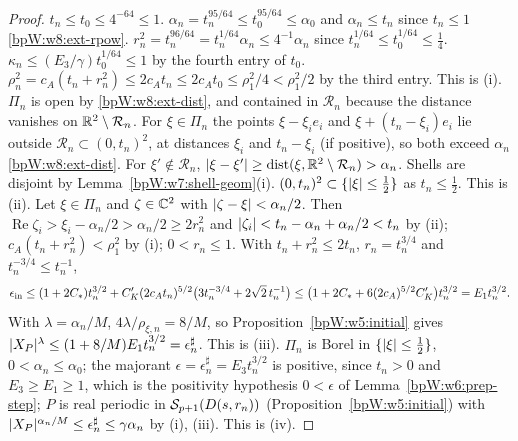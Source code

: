 \begin{proof}
\label{stepW:w8:sd-size} $t_n\le t_0\le4^{-64}\le1$. $\alpha_n=t_n^{95/64}\le t_0^{95/64}\le\alpha_0$ and
$\alpha_n\le t_n$ since $t_n\le1$ \ref{bpW:w8:ext-rpow}. $r_n^2=t_n^{96/64}=t_n^{1/64}\alpha_n\le4^{-1}\alpha_n$ since
$t_n^{1/64}\le t_0^{1/64}\le\frac14$. $\kappa_n\le(E_3/\gamma)t_0^{1/64}\le1$ by the fourth entry of $t_0$.
$\rho_n^2=c_A(t_n+r_n^2)\le2c_At_n\le2c_At_0\le\rho_1^2/4<\rho_1^2/2$ by the third entry. This is (i).
\label{stepW:w8:sd-trim} $\Pi_n$ is open by \ref{bpW:w8:ext-dist}, and contained in $\mathcal R_n$
because the distance vanishes on $\mathbb{R}^2\setminus\mathcal R_n$. For $\xi\in\Pi_n$ the points
$\xi-\xi_ie_i$ and $\xi+(t_n-\xi_i)e_i$ lie outside $\mathcal R_n\subset(0,t_n)^2$, at distances $\xi_i$ and $t_n-\xi_i$
(if positive), so both exceed $\alpha_n$ \ref{bpW:w8:ext-dist}. For $\xi'\notin\mathcal R_n$,
$\lvert \xi-\xi'\rvert\ge\operatorname{dist}(\xi,\mathbb{R}^2\setminus\mathcal R_n)>\alpha_n$. Shells are disjoint by
Lemma~\ref{bpW:w7:shell-geom}(i). $(0,t_n)^2\subset\{\lvert \xi\rvert\le\frac12\}$ as $t_n\le\frac12$. This is (ii).
\label{stepW:w8:sd-init} Let $\xi\in\Pi_n$ and $\zeta\in\mathbb{C}^2$ with
$\lvert \zeta-\xi\rvert<\alpha_n/2$. Then $\operatorname{Re}\zeta_i>\xi_i-\alpha_n/2>\alpha_n/2\ge2r_n^2$ and
$\lvert \zeta_i\rvert<t_n-\alpha_n+\alpha_n/2<t_n$ by (ii); $c_A(t_n+r_n^2)<\rho_1^2$ by (i); $0<r_n\le1$. With
$t_n+r_n^2\le2t_n$, $r_n=t_n^{3/4}$ and $t_n^{-3/4}\le t_n^{-1}$,
\[\epsilon_{\rm in}\le(1+2C_*)t_n^{3/2}+C'_K(2c_At_n)^{5/2}\bigl(3t_n^{-3/4}+2\sqrt2\,t_n^{-1}\bigr)
\le\bigl(1+2C_*+6(2c_A)^{5/2}C'_K\bigr)t_n^{3/2}=E_1t_n^{3/2}.\]
With $\lambda=\alpha_n/M$, $4\lambda/\rho_{\xi,n}=8/M$, so Proposition~\ref{bpW:w5:initial} gives
$\lvert X_P\rvert^\lambda\le(1+8/M)E_1t_n^{3/2}=\epsilon^\sharp_n$. This is (iii).
\label{stepW:w8:sd-prep} $\Pi_n$ is Borel in $\{\lvert \xi\rvert\le\frac12\}$,
$0<\alpha_n\le\alpha_0$; the majorant $\epsilon=\epsilon^\sharp_n=E_3t_n^{3/2}$ is positive, since $t_n>0$ and $E_3\ge E_1\ge1$, which is the
positivity hypothesis $0<\epsilon$ of Lemma~\ref{bpW:w6:prep-step}; $P$ is real periodic in $\mathcal S_{p+1}(D(s,r_n))$ (Proposition~\ref{bpW:w5:initial}) with
$\lvert X_P\rvert^{\alpha_n/M}\le\epsilon^\sharp_n\le\gamma\alpha_n$ by (i), (iii). This is (iv).
\end{proof}

